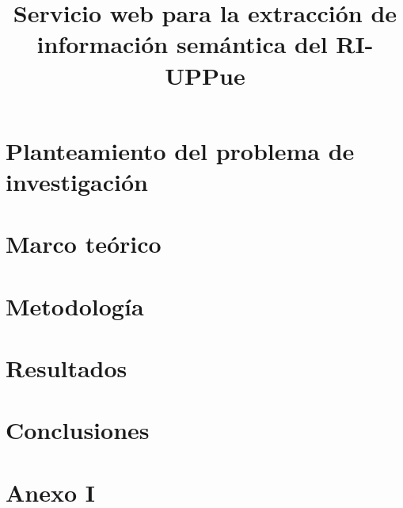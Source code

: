 \documentclass[modern,hyperref,histinit,frontispiece]{teipel-thesis-en}
\title{Servicio web para la extracción de información semántica del RI-UPPue}
\begin{document}
\setcounter{secnumdepth}{3}
\setcounter{tocdepth}{3}
\maketitle
	
	
    
\renewcommand{\contentsname}{Contenido}
  \tableofcontents 
\renewcommand{\listfigurename}{Lista de Figuras}
	\listoffigures
\renewcommand{\listtablename}{Lista de Tablas}
	\listoftables	
\beginmainmatter

	
\renewcommand{\partname}{Capitulo}

	\part{Planteamiento del problema de investigación}
	
    \part{Marco teórico}
	
    \part{Metodología} 
	
    \part{Resultados} 
	
     \part{Conclusiones} 
	
    \renewcommand{\bibname}{Bibliografía}
    
    \part{Anexo I}
    
\end{document}

